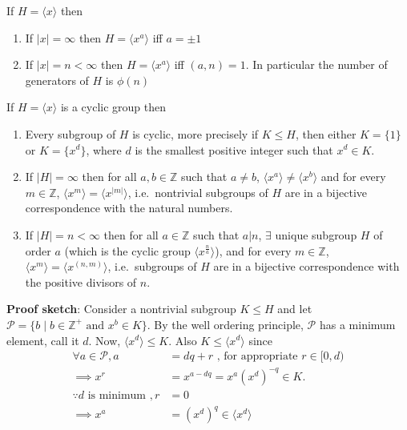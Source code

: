 \documentclass[titlepage, 12pt]{book}
\begin{document}
\begin{proposition}{}{}
    If $H = \langle x\rangle$ then
        \begin{enumerate}
            \item If $|x| = \infty$ then $H = \langle x^a\rangle$ iff $a =
                \pm 1$
            \item If $|x| = n < \infty$ then $H = \langle x^a\rangle$ iff $(a, n) =
                1$. In particular the number of generators of $H$ is $\phi(n)$
        \end{enumerate}
\end{proposition}
\begin{proposition}{}{}
    If $H = \langle x\rangle$ is a cyclic group then
        \begin{enumerate}
            \item Every subgroup of $H$ is cyclic, more precisely if $K\le H$,
                then either $K = \{1\}$ or $K = \{x^d\}$, where $d$ is the
                smallest positive integer such that $x^d\in K$.
            \item If $|H| = \infty$ then for all $a, b\in\mathbb{Z}$ such that
                $a\neq b$, $\langle x^a\rangle\neq\langle x^b\rangle$ and for
                every $m\in\mathbb{Z}$, $\langle x^m\rangle = \langle
                x^{|m|}\rangle$, i.e.\ nontrivial subgroups of $H$ are in a
                bijective correspondence with the natural numbers.
            \item If $|H| = n < \infty$ then for all $a\in\mathbb{Z}$ such that
                $a|n$, $\exists$ unique subgroup $H$ of order $a$ (which is the
                cyclic group $\langle x^{\frac{n}{a}}\rangle$), and for every
                $m\in\mathbb{Z}$, $\langle x^m\rangle = \langle x^{(n,
                m)}\rangle$, i.e.\ subgroups of $H$ are in a bijective
                correspondence with the positive divisors of $n$.
        \end{enumerate}
\end{proposition}
\textbf{Proof sketch}: Consider a nontrivial subgroup $K\leq H$ and let\newline
$\mathcal{P} = \{b\;|\;b\in\mathbb{Z^+}\textrm{ and } x^b\in K\}$. By the well
ordering principle, $\mathcal{P}$ has a minimum element, call it $d$. Now,
$\langle x^d\rangle\leq K$. Also $K\leq\langle x^d\rangle$ since
\begin{align*}
    \forall a\in\mathcal{P}, a &= dq+r\textrm{ , for appropriate $r\in [0, d)$}\\
    \implies x^r &= x^{a-dq} = x^a (x^d)^{-q}\in K.\\
    \because d\textrm{ is minimum }, r &= 0\\
    \implies x^a &= (x^d)^q \in \langle x^d\rangle
\end{align*}
\end{document}
